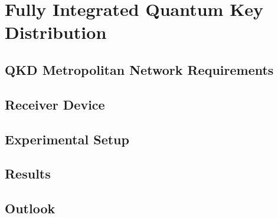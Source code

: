 %
%
\let\textcircled=\pgftextcircled
\chapter{Fully Integrated Quantum Key Distribution}
\label{chap:node}

\section{QKD Metropolitan Network Requirements}
\label{sec:sec05}

\section{Receiver Device}

\section{Experimental Setup}

\section{Results}

\section{Outlook}

